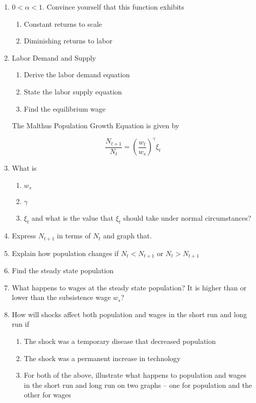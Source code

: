 \documentclass[11pt]{scrartcl}
\begin{document}
\begin{enumerate}
\item $0 < \alpha < 1$. Convince yourself that this function exhibits
\begin{enumerate}
\item Constant returns to scale
\item Diminishing returns to labor
\end{enumerate}
\item Labor Demand and Supply
\begin{enumerate}
\item Derive the labor demand equation
\item State the labor supply equation
\item Find the equilibrium wage
\end{enumerate}

The Malthus Population Growth Equation is given by 

\[ \frac{N_{t+1}}{N_t} = \left(\frac{w_t}{w_s}\right)^\gamma \xi_t \]

\item What is
\begin{enumerate}
\item $w_s$
\item $\gamma$
\item $\xi_t$ and what is the value that $\xi_t$ should take under normal circumstances?
\end{enumerate}
\item Express $N_{t+1}$ in terms of $N_t$ and graph that.
\item Explain how population changes if $N_t < N_{t+1}$ or $N_t > N_{t+1}$
\item Find the steady state population
\item What happens to wages at the steady state population? It is higher than or lower than the subsistence wage $w_s$?
\item How will shocks affect both population and wages in the short run and long run if
\begin{enumerate}
\item The shock was a temporary disease that decreased population
\item The shock was a permanent increase in technology
\item For both of the above, illustrate what happens to population and wages in the short run and long run on two graphs -- one for population and the other for wages
\end{enumerate}
\end{enumerate}
\end{document}
